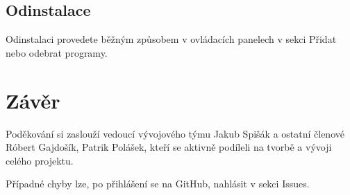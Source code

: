 \documentclass[a4paper, 11pt]{article}
\begin{document}
\subsection*{Odinstalace}
Odinstalaci provedete běžným způsobem v ovládacích panelech v sekci Přidat nebo odebrat programy.

\section{Závěr}\label{zaver}
Poděkování si zaslouží vedoucí vývojového týmu Jakub Spišák a ostatní členové Róbert Gajdošík, Patrik Polášek, kteří se aktivně podíleli na tvorbě a vývoji celého projektu.\par
Případné chyby lze, po přihlášení se na GitHub, nahlásit v sekci Issues.
\end{document}
